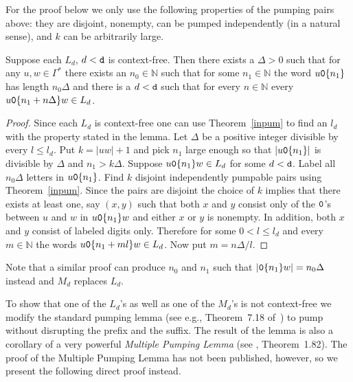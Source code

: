 \documentclass[12pt]{article}
\begin{document}
For the proof below we only use the following properties of the
pumping pairs above:
they are disjoint, nonempty, can be pumped independently (in a natural sense),
and $k$ can be arbitrarily large.

\begin{lemma}\label{cycle}Suppose each $L_d$, $d<{\tt d}$ is
  context-free. Then there exists a $\Delta>0$ such that for any
$u,w\in\Gamma^*$ there exists an $n_0\in{\mathbb N}$ such that for
  some $n_1\in{\mathbb N}$ the word $u{\tt 0}\{n_1\}$ has length
  $n_0\Delta$ and there is a $d<{\tt d}$ such that for every
  $n\in{\mathbb N}$ every $u{\tt 0}\{n_1+n\Delta\}w\in L_d$.
\end{lemma}
\begin{proof}
Since each $L_d$ is context-free one can use Theorem~\ref{inpum} to find
an $l_d$ with the property stated in the lemma. Let $\Delta$ be a
positive integer divisible by every $l\leq l_d$. Put $k=|uw|+1$ and
pick $n_1$ large enough so that $|u{\tt 0}\{n_1\}|$ is divisible by
$\Delta$ and $n_1>k\Delta$. Suppose $u{\tt 0}\{n_1\}w\in L_d$ for some
$d<{\tt d}$. Label all $n_0\Delta$ letters in $u{\tt 0}\{n_1\}$. Find $k$
disjoint independently pumpable pairs using Theorem~\ref{inpum}. Since
the pairs are disjoint the choice of $k$ implies that there exists at
least one, say $(x,y)$ such that both $x$ and $y$ consist only of the
${\tt 0}$'s between $u$ and $w$ in $u{\tt 0}\{n_1\}w$ and either $x$
or $y$ is nonempty. In addition, both $x$ and $y$ consist of labeled
digits only. Therefore for some $0<l\leq l_d$ and every $m\in{\mathbb
  N}$ the words $u{\tt 0}\{n_1+ml\}w\in L_d$. Now put $m=n\Delta/l$.
\end{proof}
Note that a similar proof can produce $n_0$ and $n_1$ such that $|{\tt
  0}\{n_1\}w|=n_0\Delta$ instead and $M_d$ replaces $L_d$.
\fi 

To show that one of the $L_d$'s as well as one of the $M_d$'s is not
context-free we modify the standard pumping lemma (see e.g., Theorem~7.18 of~\cite{hum})
to pump without disrupting the prefix and the suffix. The result of
the lemma is also a corollary of a very powerful {\it Multiple Pumping
  Lemma\/} (see \cite{Kracht}, Theorem~1.82). The proof of the
Multiple Pumping Lemma has not been published, however, so we present
the following direct proof instead.
\end{document}
